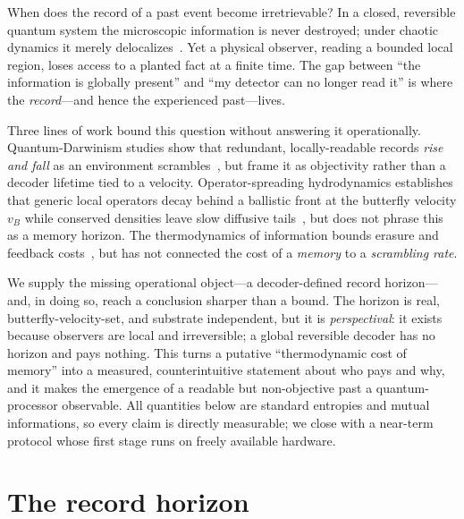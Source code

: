 \documentclass[aps,prxquantum,twocolumn,superscriptaddress,longbibliography]{revtex4-2}
\newcommand{\vB}{v_{B}}
\begin{document}
When does the record of a past event become irretrievable? In a closed, reversible quantum system
the microscopic information is never destroyed; under chaotic dynamics it merely
delocalizes~\cite{hayden2007,sekino2008}. Yet a physical observer, reading a bounded local region,
loses access to a planted fact at a finite time. The gap between ``the information is globally
present'' and ``my detector can no longer read it'' is where the \emph{record}---and hence the
experienced past---lives.

Three lines of work bound this question without answering it operationally. Quantum-Darwinism
studies show that redundant, locally-readable records \emph{rise and fall} as an environment
scrambles~\cite{riedel2012,touil2021}, but frame it as objectivity rather than a decoder lifetime
tied to a velocity. Operator-spreading hydrodynamics establishes that generic local operators
decay behind a ballistic front at the butterfly velocity $\vB$ while conserved densities leave slow
diffusive tails~\cite{vonkeyserlingk2018,rakovszky2018,nahum2018}, but does not phrase this as a
memory horizon. The thermodynamics of information bounds erasure and feedback
costs~\cite{landauer1961,bennett1982,sagawa2010,parrondo2015}, but has not connected the cost of a
\emph{memory} to a \emph{scrambling rate}.

We supply the missing operational object---a decoder-defined record horizon---and, in doing so,
reach a conclusion sharper than a bound. The horizon is real, butterfly-velocity-set, and
substrate independent, but it is \emph{perspectival}: it exists because observers are local and
irreversible; a global reversible decoder has no horizon and pays nothing. This turns a putative
``thermodynamic cost of memory'' into a measured, counterintuitive statement about who pays and
why, and it makes the emergence of a readable but non-objective past a quantum-processor
observable. All quantities below are standard entropies and mutual informations, so every claim is
directly measurable; we close with a near-term protocol whose first stage runs on freely available
hardware.

\section{The record horizon}
\end{document}

